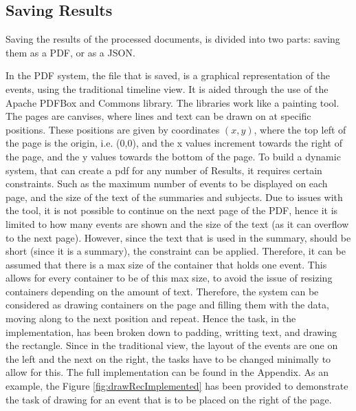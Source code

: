\subsection{Saving Results}
\par Saving the results of the processed documents, is divided into two parts: saving them as a PDF, or as a JSON. 
\par In the PDF system, the file that is saved, is a graphical representation of the events, using the traditional timeline view. It is aided through the use of the Apache PDFBox and Commons library. The libraries work like a painting tool. The pages are canvises, where lines and text can be drawn on at specific positions. These positions are given by coordinates $(x,y)$, where the top left of the page is the origin, i.e. (0,0), and the x values increment towards the right of the page, and the y values towards the bottom of the page. To build a dynamic system, that can create a pdf for any number of Results, it requires certain constraints. Such as the maximum number of events to be displayed on each page, and the size of the text of the summaries and subjects. Due to issues with the tool, it is not possible to continue on the next page of the PDF, hence it is limited to how many events are shown and the size of the text (as it can overflow to the next page). However, since the text that is used in the summary, should  be short (since it is a summary), the constraint can be applied. Therefore, it can be assumed that there is a max size of the container that holds one event. This allows for every container to be of this max size, to avoid the issue of resizing containers depending on the amount of text. Therefore, the system can be considered as drawing containers on the page and filling them with the data, moving along to the next position and repeat. Hence the task, in the implementation, has been broken down to padding, writting text, and drawing the rectangle. Since in the traditional view, the layout of the events are one on the left and the next on the right, the tasks have to be changed minimally to allow for this. The full implementation can be found in the Appendix. As an example, the Figure \ref{fig:drawRecImplemented} has been provided to demonstrate the task of drawing for an event that is to be placed on the right of the page.

